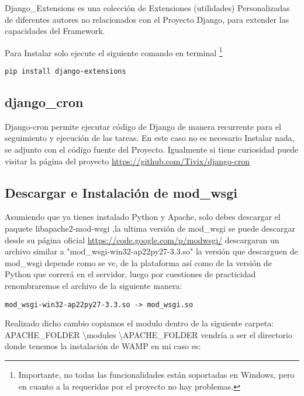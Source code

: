Django\_Extensions es una colección de Extensiones (utilidades) Personalizadas de diferentes autores no relacionados con el Proyecto Django, para extender las capacidades del Framework.

Para Instalar solo ejecute el siguiente comando en terminal \footnote{Importante, no todas las funcionalidades están soportadas en Windows, pero en cuanto a la requeridas por el proyecto no hay problemas.}

\begin{lstlisting}[style=consola]
     pip install django-extensions
\end{lstlisting}
\vspace{0.1cm}


\subsection{django\_cron}

Django-cron permite ejecutar código de Django de manera recurrente para el seguimiento y ejecución de las tareas. En este caso no es necesario Instalar nada, se adjunto con el código fuente del Proyecto. Igualmente si tiene curiosidad puede visitar la página del proyecto \url{https://github.com/Tivix/django-cron}

\subsection{Descargar e Instalación de mod\_wsgi}

 Asumiendo que ya  tienes instalado Python y Apache, solo debes descargar el paquete  libapache2-mod-wsgi ,la ultima versión de mod\_wsgi se puede descargar desde su  página oficial  \url{https://code.google.com/p/modwsgi/} descargaran un archivo  similar a "mod\_wsgi-win32-ap22py27-3.3.so" la versión que descarguen de mod\_wsgi  depende como se ve, de la plataforma así como de la versión de Python que  correrá en el servidor, luego por cuestiones de practicidad renombraremos  el archivo de la siguiente manera:

\begin{lstlisting}[style=consola]
    mod_wsgi-win32-ap22py27-3.3.so -> mod_wsgi.so
\end{lstlisting}
\vspace{0.1cm}

Realizado dicho cambio copiamos el modulo dentro de la siguiente carpeta: APACHE\_FOLDER \textbackslash modules \textbackslash APACHE\_FOLDER vendría a ser el directorio donde tenemos la instalación de WAMP en mi caso es: 

